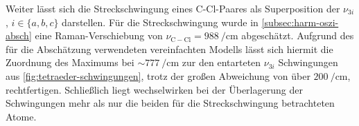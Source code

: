 \documentclass[../bericht.tex]{subfiles}
\begin{document}
        Weiter lässt sich die Streckschwingung eines C-Cl-Paares als Superposition der $\nu_{3i}$, $i\in\{ a,b,c\}$ darstellen. Für die Streckschwingung wurde in \cref{subsec:harm-oszi-absch} eine Raman-Verschiebung von $\nu_\mathrm{C-Cl}=\SI{988}{\per\centi\meter}$ abgeschätzt. Aufgrund des für die Abschätzung verwendeten vereinfachten Modells lässt sich hiermit die Zuordnung des Maximums bei $\sim \SI{777}{\per\centi\meter}$ zur den entarteten $\nu_{3i}$ Schwingungen aus \cref{fig:tetraeder-schwingungen}, trotz der großen Abweichung von über $\SI{200}{\per\centi\meter}$, rechtfertigen. Schließlich liegt wechselwirken bei der Überlagerung der Schwingungen mehr als nur die beiden für die Streckschwingung betrachteten Atome.
        \medskip

        \begin{figure}[p]
          \centering
            \\
\end{figure}
\end{document}
